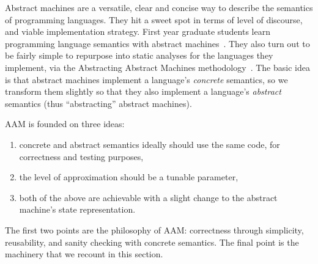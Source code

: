 Abstract machines are a versatile, clear and concise way to describe the semantics of programming languages.
%
They hit a sweet spot in terms of level of discourse, and viable implementation strategy.
%
First year graduate students learn programming language semantics with abstract machines~\cite{dvanhorn:Felleisen2009Semantics}.
%
They also turn out to be fairly simple to repurpose into static analyses for the languages they implement, via the Abstracting Abstract Machines methodology~\citep{dvanhorn:VanHorn2010Abstracting}.
%
The basic idea is that abstract machines implement a language's \emph{concrete} semantics, so we transform them slightly so that they also implement a language's \emph{abstract} semantics (thus ``abstracting'' abstract machines).

AAM is founded on three ideas:
\begin{enumerate}
\item{concrete and abstract semantics ideally should use the same code, for correctness and testing purposes,}
\item{the level of approximation should be a tunable parameter,}
\item{both of the above are achievable with a slight change to the abstract machine's state representation.}
\end{enumerate}

The first two points are the philosophy of AAM: correctness through simplicity, reusability, and sanity checking with concrete semantics.
%
The final point is the machinery that we recount in this section.

